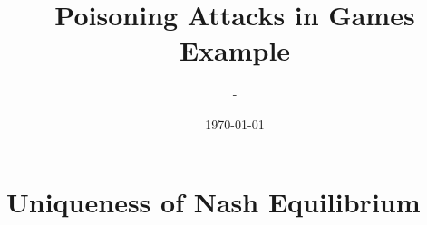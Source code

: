 \documentclass{article}
\title{Poisoning Attacks in Games Example}
\author{-}
\date{\today}
\begin{document}
\newtheorem{thm}{Theorem}
\newtheorem{cor}{Corollary}
\newtheorem{lem}{Lemma}
\newtheorem{prop}{Proposition}
\newtheorem{conj}{Conjecture}
\newtheorem{algo}{Algorithm}
\newtheorem{obs}{Observation}
\newtheorem{clm}{Claim}
\theoremstyle{definition}
\newtheorem{df}{Definition}
\newtheorem{eg}{Example}
\newtheorem{asm}{Assumption}
\newtheorem{cond}{Condition}
\theoremstyle{remark}
\newtheorem{rmk}{Remark}
\maketitle \onehalfspacing \allowdisplaybreaks \raggedbottom


\section{Uniqueness of Nash Equilibrium} 
\end{document}
